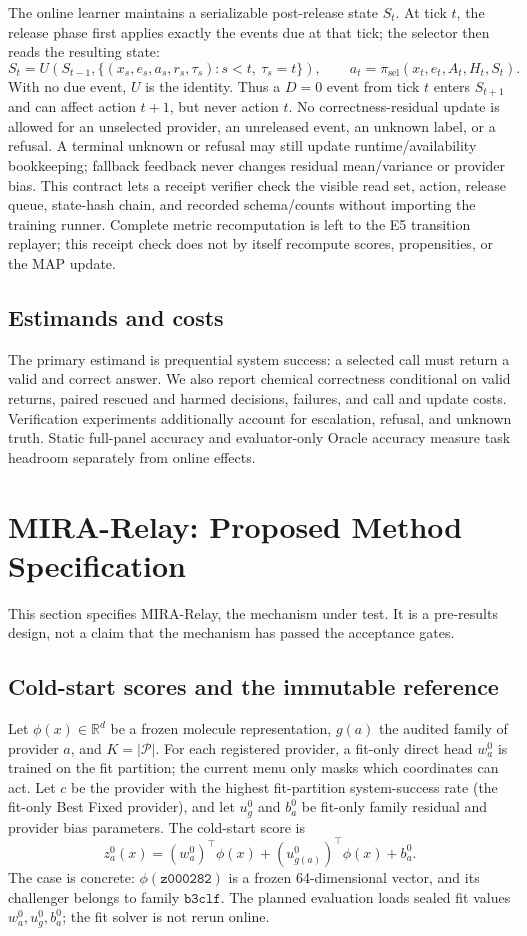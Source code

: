 \documentclass[sigconf,anonymous]{aamas}
\begin{document}
The online learner maintains a serializable post-release state $S_t$. At tick $t$, the release phase first applies exactly the events due at that tick; the selector then reads the resulting state:
$$
S_t=U\left(S_{t-1},\{(x_s,e_s,a_s,r_s,\tau_s):s<t,\ \tau_s=t\}\right),
\qquad a_t=\pi_{\mathrm{sel}}(x_t,e_t,A_t,H_t,S_t).
$$
With no due event, $U$ is the identity. Thus a $D=0$ event from tick $t$ enters $S_{t+1}$ and can affect action $t+1$, but never action $t$.
No correctness-residual update is allowed for an unselected provider, an unreleased event, an unknown label, or a refusal. A terminal unknown or refusal may still update runtime/availability bookkeeping; fallback feedback never changes residual mean/variance or provider bias. This contract lets a receipt verifier check the visible read set, action, release queue, state-hash chain, and recorded schema/counts without importing the training runner. Complete metric recomputation is left to the E5 transition replayer; this receipt check does not by itself recompute scores, propensities, or the MAP update.

\subsection{Estimands and costs}
The primary estimand is prequential system success: a selected call must return a valid and correct answer. We also report chemical correctness conditional on valid returns, paired rescued and harmed decisions, failures, and call and update costs. Verification experiments additionally account for escalation, refusal, and unknown truth. Static full-panel accuracy and evaluator-only Oracle accuracy measure task headroom separately from online effects.

\section{MIRA-Relay: Proposed Method Specification}
This section specifies MIRA-Relay, the mechanism under test. It is a pre-results design, not a claim that the mechanism has passed the acceptance gates.

\subsection{Cold-start scores and the immutable reference}
Let $\phi(x)\in\mathbb{R}^{d}$ be a frozen molecule representation, $g(a)$ the audited family of provider $a$, and $K=|\mathcal P|$. For each registered provider, a fit-only direct head $w_a^0$ is trained on the fit partition; the current menu only masks which coordinates can act. Let $c$ be the provider with the highest fit-partition system-success rate (the fit-only Best Fixed provider), and let $u_g^0$ and $b_a^0$ be fit-only family residual and provider bias parameters. The cold-start score is
$$
z_a^0(x)=(w_a^0)^\top\phi(x)+(u_{g(a)}^0)^\top\phi(x)+b_a^0.
$$
The case is concrete: $\phi(\texttt{z000282})$ is a frozen 64-dimensional vector, and its challenger belongs to family $\texttt{b3clf}$. The planned evaluation loads sealed fit values $w_a^0,u_g^0,b_a^0$; the fit solver is not rerun online.
\end{document}
